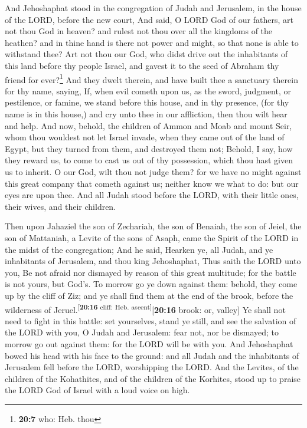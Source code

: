  And Jehoshaphat stood in the congregation of Judah and
Jerusalem, in the house of the LORD, before the new court,
 And said, O LORD God of our fathers, art not thou God in
heaven? and rulest not thou over all the kingdoms of the heathen? and in
thine hand is there not power and might, so that none is able to
withstand thee?  Art not thou our God, who didst drive out
the inhabitants of this land before thy people Israel, and gavest it to
the seed of Abraham thy friend for ever?\footnote{\textbf{20:7} who:
  Heb. thou}  And they dwelt therein, and have built thee
a sanctuary therein for thy name, saying,  If, when evil
cometh upon us, as the sword, judgment, or pestilence, or famine, we
stand before this house, and in thy presence, (for thy name is in this
house,) and cry unto thee in our affliction, then thou wilt hear and
help.  And now, behold, the children of Ammon and Moab
and mount Seir, whom thou wouldest not let Israel invade, when they came
out of the land of Egypt, but they turned from them, and destroyed them
not;  Behold, I say, how they reward us, to come to cast
us out of thy possession, which thou hast given us to inherit.
 O our God, wilt thou not judge them? for we have no
might against this great company that cometh against us; neither know we
what to do: but our eyes are upon thee.  And all Judah
stood before the LORD, with their little ones, their wives, and their
children.

 Then upon Jahaziel the son of Zechariah, the son of
Benaiah, the son of Jeiel, the son of Mattaniah, a Levite of the sons of
Asaph, came the Spirit of the LORD in the midst of the congregation;
 And he said, Hearken ye, all Judah, and ye inhabitants
of Jerusalem, and thou king Jehoshaphat, Thus saith the LORD unto you,
Be not afraid nor dismayed by reason of this great multitude; for the
battle is not yours, but God's.  To morrow go ye down
against them: behold, they come up by the cliff of Ziz; and ye shall
find them at the end of the brook, before the wilderness of
Jeruel.\textsuperscript{{[}\textbf{20:16} cliff: Heb.
ascent{]}}{[}\textbf{20:16} brook: or, valley{]}  Ye
shall not need to fight in this battle: set yourselves, stand ye still,
and see the salvation of the LORD with you, O Judah and Jerusalem: fear
not, nor be dismayed; to morrow go out against them: for the LORD will
be with you.  And Jehoshaphat bowed his head with his
face to the ground: and all Judah and the inhabitants of Jerusalem fell
before the LORD, worshipping the LORD.  And the Levites,
of the children of the Kohathites, and of the children of the Korhites,
stood up to praise the LORD God of Israel with a loud voice on high.

